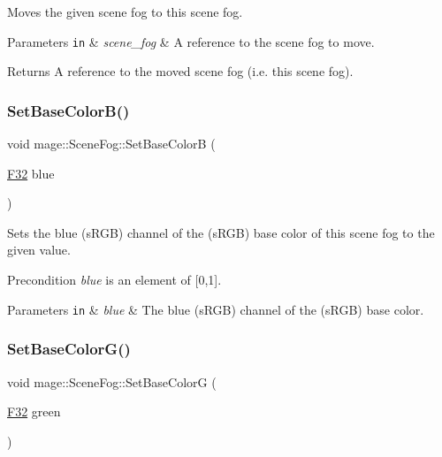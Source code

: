 Moves the given scene fog to this scene fog.


\begin{DoxyParams}[1]{Parameters}
\mbox{\tt in}  & {\em scene\+\_\+fog} & A reference to the scene fog to move. \\
\hline
\end{DoxyParams}
\begin{DoxyReturn}{Returns}
A reference to the moved scene fog (i.\+e. this scene fog). 
\end{DoxyReturn}
\hypertarget{classmage_1_1_scene_fog_a832992a0f8e771ae007b2a4c32d213b0}{}\label{classmage_1_1_scene_fog_a832992a0f8e771ae007b2a4c32d213b0} 
\subsubsection{\texorpdfstring{Set\+Base\+Color\+B()}{SetBaseColorB()}}
{\footnotesize\ttfamily void mage\+::\+Scene\+Fog\+::\+Set\+Base\+ColorB (\begin{DoxyParamCaption}\item[{\hyperlink{namespacemage_aa97e833b45f06d60a0a9c4fc22ae02c0}{F32}}]{blue }\end{DoxyParamCaption})\hspace{0.3cm}{\ttfamily [noexcept]}}

Sets the blue (s\+R\+GB) channel of the (s\+R\+GB) base color of this scene fog to the given value.

\begin{DoxyPrecond}{Precondition}
{\itshape blue} is an element of \mbox{[}0,1\mbox{]}. 
\end{DoxyPrecond}

\begin{DoxyParams}[1]{Parameters}
\mbox{\tt in}  & {\em blue} & The blue (s\+R\+GB) channel of the (s\+R\+GB) base color. \\
\hline
\end{DoxyParams}
\hypertarget{classmage_1_1_scene_fog_af13626f7fef6bfd6e4954f11fb0a7c0f}{}\label{classmage_1_1_scene_fog_af13626f7fef6bfd6e4954f11fb0a7c0f} 
\subsubsection{\texorpdfstring{Set\+Base\+Color\+G()}{SetBaseColorG()}}
{\footnotesize\ttfamily void mage\+::\+Scene\+Fog\+::\+Set\+Base\+ColorG (\begin{DoxyParamCaption}\item[{\hyperlink{namespacemage_aa97e833b45f06d60a0a9c4fc22ae02c0}{F32}}]{green }\end{DoxyParamCaption})\hspace{0.3cm}{\ttfamily [noexcept]}}

